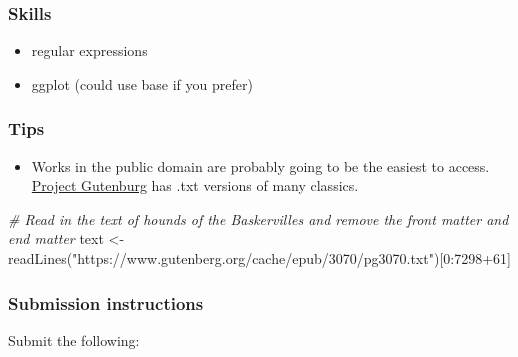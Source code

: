 \documentclass[
  openany]{book}
\newenvironment{Shaded}{\begin{snugshade}}{\end{snugshade}}
\newcommand{\CommentTok}[1]{\textcolor[rgb]{0.56,0.35,0.01}{\textit{#1}}}
\newcommand{\DecValTok}[1]{\textcolor[rgb]{0.00,0.00,0.81}{#1}}
\newcommand{\FunctionTok}[1]{\textcolor[rgb]{0.00,0.00,0.00}{#1}}
\newcommand{\NormalTok}[1]{#1}
\newcommand{\OtherTok}[1]{\textcolor[rgb]{0.56,0.35,0.01}{#1}}
\newcommand{\SpecialCharTok}[1]{\textcolor[rgb]{0.00,0.00,0.00}{#1}}
\newcommand{\StringTok}[1]{\textcolor[rgb]{0.31,0.60,0.02}{#1}}
\providecommand{\tightlist}{%
  \setlength{\itemsep}{0pt}\setlength{\parskip}{0pt}}
\begin{document}
\hypertarget{skills}{%
\subsubsection{Skills}\label{skills}}

\begin{itemize}
\tightlist
\item
  regular expressions\\
\item
  ggplot (could use base if you prefer)
\end{itemize}

\hypertarget{tips}{%
\subsubsection{Tips}\label{tips}}

\begin{itemize}
\tightlist
\item
  Works in the public domain are probably going to be the easiest to access. \href{https://www.gutenberg.org/}{Project Gutenburg} has .txt versions of many classics.
\end{itemize}

\begin{Shaded}
\begin{Highlighting}[]
\CommentTok{\# Read in the text of hounds of the Baskervilles and remove the front matter and end matter}
\NormalTok{text }\OtherTok{\textless{}{-}} \FunctionTok{readLines}\NormalTok{(}\StringTok{"https://www.gutenberg.org/cache/epub/3070/pg3070.txt"}\NormalTok{)[}\DecValTok{0}\SpecialCharTok{:}\DecValTok{7298}\SpecialCharTok{+}\DecValTok{61}\NormalTok{]}
\end{Highlighting}
\end{Shaded}

\hypertarget{submission-instructions-2}{%
\subsubsection{Submission instructions}\label{submission-instructions-2}}

Submit the following:
\end{document}
